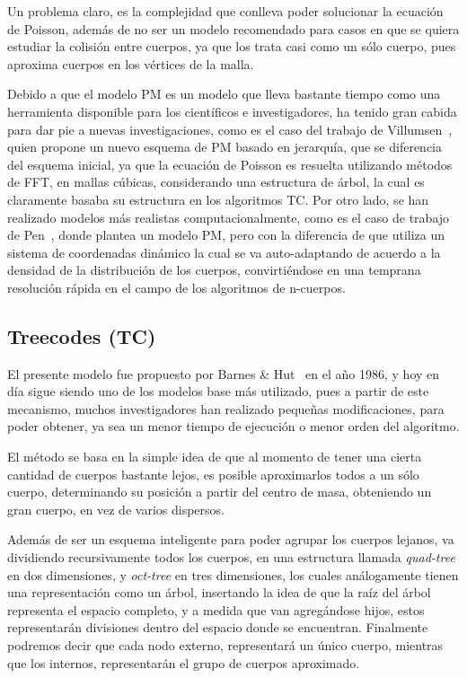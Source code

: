 Un problema claro, es la complejidad que conlleva poder solucionar la ecuación de Poisson,
además de no ser un modelo recomendado para casos en que se quiera estudiar la colisión
entre cuerpos, ya que los trata casi como un sólo cuerpo, pues
aproxima cuerpos en los vértices de la malla.

Debido a que el modelo PM es un modelo que lleva bastante
tiempo como una herramienta disponible para los científicos e investigadores,
ha tenido gran cabida para dar pie a nuevas investigaciones, como
es el caso del trabajo de Villumsen~\cite{villumsen}, quien propone
un nuevo esquema de PM basado en jerarquía, que se diferencia del esquema inicial,
ya que la ecuación de Poisson es resuelta utilizando métodos de FFT,
en mallas cúbicas, considerando una estructura de árbol,
la cual es claramente basaba su estructura en los algoritmos TC.
Por otro lado, se han realizado modelos más realistas computacionalmente,
como es el caso de trabajo de Pen~\cite{pen}, donde plantea un modelo PM,
pero con la diferencia de que utiliza un sistema de coordenadas dinámico
la cual se va auto-adaptando de acuerdo a la densidad de la distribución
de los cuerpos, convirtiéndose en una temprana resolución rápida
en el campo de los algoritmos de n-cuerpos.

\subsection{Treecodes (TC)}

El presente modelo fue propuesto por Barnes \& Hut~\cite{treecode}
en el año 1986, y hoy en día sigue siendo uno de los modelos base más utilizado,
pues a partir de este mecanismo,
muchos investigadores han realizado pequeñas modificaciones,
para poder obtener, ya sea un menor tiempo de ejecución o menor orden
del algoritmo.

El método se basa en la simple idea de que al momento de tener una cierta
cantidad de cuerpos bastante lejos, es posible aproximarlos todos
a un sólo cuerpo, determinando su posición a partir del centro de masa,
obteniendo un gran cuerpo, en vez de varios dispersos.

Además de ser un esquema inteligente para poder agrupar los cuerpos
lejanos, va dividiendo recursivamente todos los cuerpos,
en una estructura llamada \emph{quad-tree} en dos dimensiones,
y \emph{oct-tree} en tres dimensiones, los cuales análogamente
tienen una representación como un árbol, insertando la idea
de que la raíz del árbol representa el espacio completo,
y a medida que van agregándose hijos, estos representarán
divisiones dentro del espacio donde se encuentran.
Finalmente podremos decir que cada nodo externo,
representará un único cuerpo, mientras que los internos,
representarán el grupo de cuerpos aproximado.

